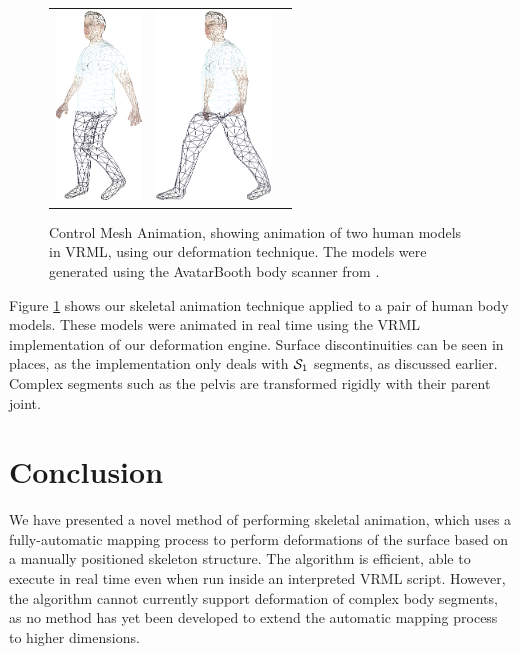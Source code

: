 \begin{figure}
\begin{center}
\begin{tabular}{ccc}
\includegraphics[height=5cm]{../images/warren_wire2} &
\includegraphics[height=5cm]{../images/warren_wire3} \\
\end{tabular}
\caption[Control Mesh Animation]{\label{fig:controlanim} Control Mesh Animation, showing animation of two human models in VRML, using our deformation technique. The models were generated using the AvatarBooth body scanner from \citet{AvatarMe}.}
\end{center}
\end{figure}

Figure \ref{fig:controlanim} shows our skeletal animation technique applied to a pair of human body models. These models were animated in real time using the VRML implementation of our deformation engine. Surface discontinuities can be seen in places, as the implementation only deals with ${\cal S}_1$ segments, as discussed earlier. Complex segments such as the pelvis are transformed rigidly with their parent joint.

\section{\label{sec:skeletalanim:conclusion}Conclusion}

We have presented a novel method of performing skeletal animation, which uses a fully-automatic mapping process to perform deformations of the surface based on a manually positioned skeleton structure. The algorithm is efficient, able to execute in real time even when run inside an interpreted VRML script. However, the algorithm cannot currently support deformation of complex body segments, as no method has yet been developed to extend the automatic mapping process to higher dimensions.

